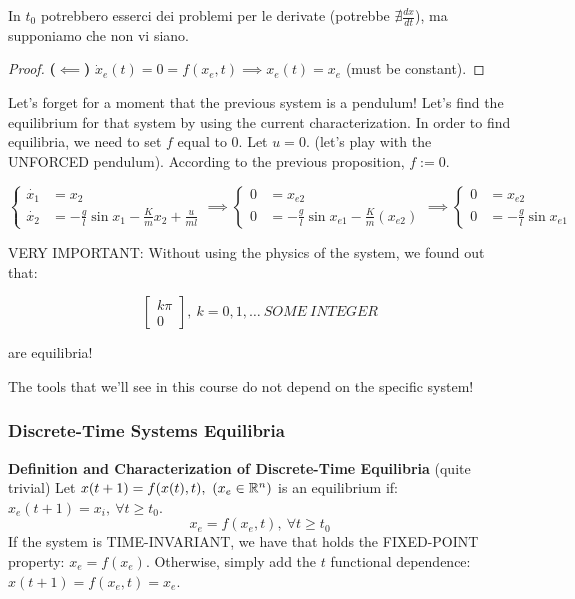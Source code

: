 In $t_0$ potrebbero esserci dei problemi per le derivate (potrebbe $\nexists \frac{dx}{dt}$), ma supponiamo che non vi siano.

\begin{proof}{\textbf{($\impliedby$)}}
$\dot{x}_e(t) = 0 = f(x_e,t) \implies x_e(t) = x_e$ (must be constant).
\end{proof}

Let's forget for a moment that the previous system is a pendulum! Let's find the equilibrium for that system by using the current characterization. In order to find equilibria, we need to set $f$ equal to 0. Let $u = 0$. (let's play with the UNFORCED pendulum). According to the previous proposition, $f := 0$.

\[
	\left\{
	\begin{aligned}
	\dot{x_1} &= x_2 \\
	\dot{x_2} &= -\frac{g}{l}\sin{x_1} - \frac{K}{m}x_2 + \frac{u}{ml}
	\end{aligned} 
	\right.
	\implies \left\{
	\begin{aligned}
	0 &= x_{e2} \\
	0 &= -\frac{g}{l}\sin{x_{e1}} - \frac{K}{m}(x_{e2})
	\end{aligned} 
	\right. \implies \left\{
	\begin{aligned}
	0 &= x_{e2} \\
	0 &= -\frac{g}{l}\sin{x_{e1}}
	\end{aligned} 
	\right.
\]

VERY IMPORTANT: Without using the physics of the system, we found out that: 

\[
	{\begin{bmatrix}k\pi \\ 0\end{bmatrix},\ k=0,1,\dots\ SOME\ INTEGER}
\]

are equilibria! 

The tools that we'll see in this course do not depend on the specific system!

\subsubsection{Discrete-Time Systems Equilibria}

\begin{prop}{\textbf{Definition and Characterization of Discrete-Time Equilibria} (quite trivial)}
Let $x(t+1) = f(x(t),t),\ (x_e \in \mathbb{R}^n)$ is an equilibrium if: $x_e(t+1) = x_i,\ \forall t \geq t_0$.
\[
	x_e = f(x_e, t),\ \forall t \geq t_0
\]
If the system is TIME-INVARIANT, we have that holds the FIXED-POINT property: $x_e = f(x_e)$. Otherwise, simply add the $t$ functional dependence: $x(t+1) = f(x_e,t) = x_e$.
\end{prop}

